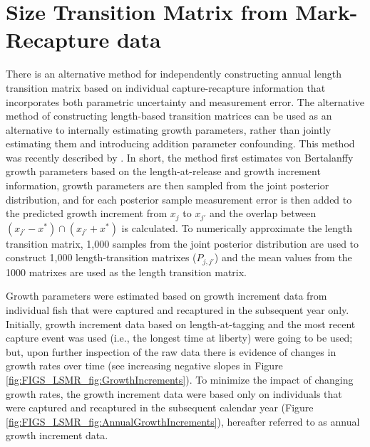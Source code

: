 
\section{Size Transition Matrix from Mark-Recapture data} %
\label{sec:size_transition_matrix_from_mark_recapture_data}


There is an alternative method for independently constructing annual length transition matrix based on individual capture-recapture information that incorporates both parametric uncertainty and measurement error.  The alternative method of constructing length-based transition matrices can be used as an alternative to internally estimating growth parameters, rather than jointly estimating them and introducing addition parameter confounding.  This method was recently described by \cite{hillary2010new}. In short, the method first estimates von Bertalanffy growth parameters based on the length-at-release and growth increment information, growth parameters are then sampled from the joint posterior distribution, and for each posterior sample measurement error is then added to the predicted growth increment  from $x_j$ to $x_{j'}$ and the overlap between $(x_{j'}-x^*) \cap (x_{j'}+x^*)$ is calculated.  To numerically approximate the length transition matrix, 1,000 samples from the joint posterior distribution are used to construct 1,000 length-transition matrixes ($P_{j,j'}$) and the mean values from the 1000 matrixes are used as the length transition matrix.

Growth parameters were estimated based on growth increment data from individual fish that were captured and recaptured in the subsequent year only.  Initially, growth increment data based on length-at-tagging and the most recent capture event was used (i.e., the longest time at liberty) were going to be used; but, upon further inspection of the raw data  there is evidence of changes in growth rates over time (see increasing negative slopes in Figure \ref{fig:FIGS_LSMR_fig:GrowthIncrements}).  To minimize the impact of changing growth rates, the growth increment data were based only on individuals that were captured and recaptured in the subsequent calendar year (Figure \ref{fig:FIGS_LSMR_fig:AnnualGrowthIncrements}), hereafter referred to as annual growth increment data.


